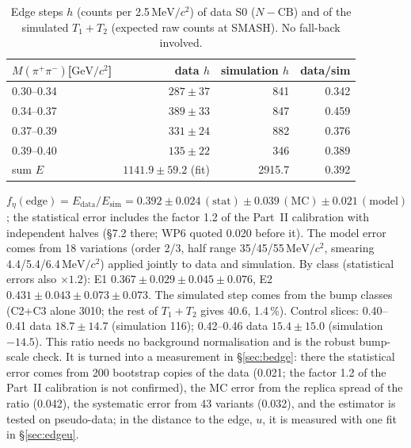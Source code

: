 \documentclass[11pt,a4paper]{article}
\newcommand{\Mpipi}{\ensuremath{M(\pi^{+}\pi^{-})}\xspace}
\newcommand{\GeVcc}{\ensuremath{\mathrm{GeV}/c^{2}}\xspace}
\newcommand{\MeVcc}{\ensuremath{\mathrm{MeV}/c^{2}}\xspace}
\begin{document}
\begin{table}[H]
\centering
\caption{Edge steps $h$ (counts per 2.5\,\MeVcc) of data S0 ($N-\mathrm{CB}$) and of the simulated $T_1+T_2$ (expected raw counts at SMASH). No fall-back involved.}
\label{tab:edge}
\small
\begin{tabular}{@{}l r r r@{}}
\toprule
\Mpipi [\GeVcc] & data $h$ & simulation $h$ & data/sim \\
\midrule
0.30--0.34 & $287\pm37$ & 841 & 0.342 \\
0.34--0.37 & $389\pm33$ & 847 & 0.459 \\
0.37--0.39 & $331\pm24$ & 882 & 0.376 \\
0.39--0.40 & $135\pm22$ & 346 & 0.389 \\
sum $E$ & $1141.9\pm59.2$ (fit) & 2915.7 & 0.392 \\
\bottomrule
\end{tabular}
\end{table}

$f_\eta(\mathrm{edge})=E_{\mathrm{data}}/E_{\mathrm{sim}}=0.392\pm0.024\,(\mathrm{stat})\pm0.039\,(\mathrm{MC})\pm0.021\,(\mathrm{model})$; the
statistical error includes the factor 1.2 of the Part~II calibration with independent halves (\S7.2 there; WP6 quoted 0.020 before it). The
model error comes from 18 variations (order 2/3, half range 35/45/55\,\MeVcc, smearing 4.4/5.4/6.4\,\MeVcc) applied jointly to data and
simulation. By class (statistical errors also $\times1.2$): E1 $0.367\pm0.029\pm0.045\pm0.076$, E2 $0.431\pm0.043\pm0.073\pm0.073$. The simulated step comes from the bump classes
(C2+C3 alone 3010; the rest of $T_1+T_2$ gives 40.6, 1.4\,\%). Control slices: 0.40--0.41 data $18.7\pm14.7$ (simulation 116); 0.42--0.46
data $15.4\pm15.0$ (simulation $-14.5$). This ratio needs no background normalisation and is the robust bump-scale check. It is turned into a
measurement in \S\ref{sec:bedge}: there the statistical error comes from 200 bootstrap copies of the data (0.021; the factor 1.2 of the Part~II
calibration is not confirmed), the MC error from the replica spread of the ratio (0.042), the systematic error from 43 variants (0.032), and the
estimator is tested on pseudo-data; in the distance to the edge, $u$, it is measured with one fit in \S\ref{sec:edgeu}.
\end{document}
